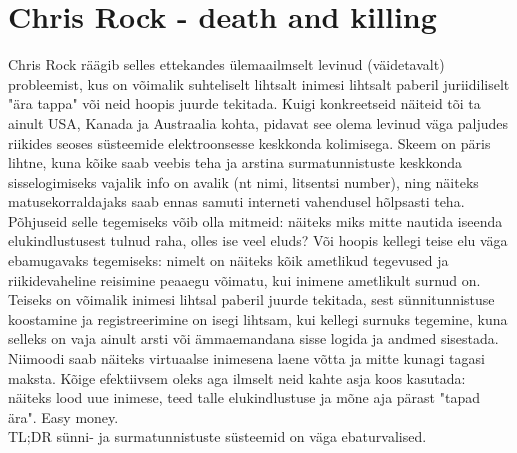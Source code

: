 \documentclass{article}
\begin{document}
\section{Chris Rock - death and killing}
Chris Rock räägib selles ettekandes ülemaailmselt levinud (väidetavalt) probleemist, 
kus on võimalik suhteliselt lihtsalt inimesi lihtsalt paberil juriidiliselt "ära tappa" või neid hoopis juurde tekitada. 
Kuigi konkreetseid näiteid tõi ta ainult USA, Kanada ja Austraalia kohta, pidavat see olema levinud väga paljudes riikides 
seoses süsteemide elektroonsesse keskkonda kolimisega. Skeem on päris lihtne, kuna kõike saab veebis teha ja 
arstina surmatunnistuste keskkonda sisselogimiseks vajalik info on avalik (nt nimi, litsentsi number), ning näiteks 
matusekorraldajaks saab ennas samuti interneti vahendusel hõlpsasti teha. Põhjuseid selle tegemiseks võib olla mitmeid: 
näiteks miks mitte nautida iseenda elukindlustusest tulnud raha, olles ise veel eluds? Või hoopis kellegi teise elu väga ebamugavaks 
tegemiseks: nimelt on näiteks kõik ametlikud tegevused ja riikidevaheline reisimine peaaegu võimatu, kui inimene ametlikult surnud on. 
Teiseks on võimalik inimesi lihtsal paberil juurde tekitada, sest sünnitunnistuse koostamine ja registreerimine on isegi lihtsam, 
kui kellegi surnuks tegemine, kuna selleks on vaja ainult arsti või ämmaemandana sisse logida ja andmed sisestada. 
Niimoodi saab näiteks virtuaalse inimesena laene võtta ja mitte kunagi tagasi maksta. Kõige efektiivsem oleks aga ilmselt neid kahte asja koos kasutada: 
näiteks lood uue inimese, teed talle elukindlustuse ja mõne aja pärast "tapad ära". Easy money.\\
TL;DR sünni- ja surmatunnistuste süsteemid on väga ebaturvalised.
\end{document}
